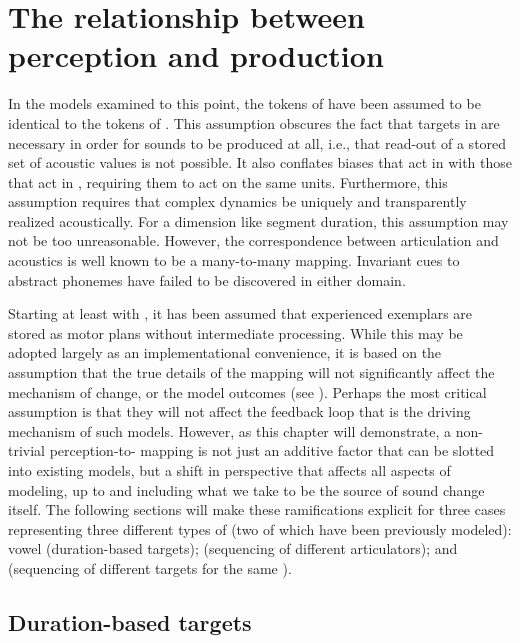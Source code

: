 \chapter{The relationship between perception and production}\label{ch:Perception-Production}

In the models examined to this point, the tokens of  have
been assumed to be identical to the tokens of . This assumption
obscures the fact that targets in  are necessary in order
for sounds to be produced at all, i.e., that read-out of a stored
set of acoustic values is not possible. It also conflates biases that
act in  with those that act in , requiring them
to act on the same units. Furthermore, this assumption requires that
complex  dynamics be uniquely and transparently realized
acoustically. For a dimension like segment duration, this assumption
may not be too unreasonable. However, the correspondence between articulation
and acoustics is well known to be a many-to-many mapping. Invariant
cues to abstract phonemes have failed to be discovered in either domain. 

Starting at least with \citet{Goldinger1996}, it has been assumed
that experienced exemplars are stored as motor plans without intermediate
processing. While this may be adopted largely as an implementational
convenience, it is based on the assumption that the true details of
the mapping will not significantly affect the mechanism of change,
or the model outcomes (see \citealt{Pierrehumbert2000}). Perhaps
the most critical assumption is that they will not affect the feedback
loop that is the driving mechanism of such models. However, as this
chapter will demonstrate, a non-trivial perception-to- mapping
is not just an additive factor that can be slotted into existing models,
but a shift in perspective that affects all aspects of modeling, up
to and including what we take to be the source of sound change itself.
The following sections will make these ramifications explicit for
three cases representing three different types of   (two
of which have been previously modeled): vowel  (duration-based
targets);  (sequencing of different articulators);
and  (sequencing of different targets for the
same ). 

\section{Duration-based targets}

